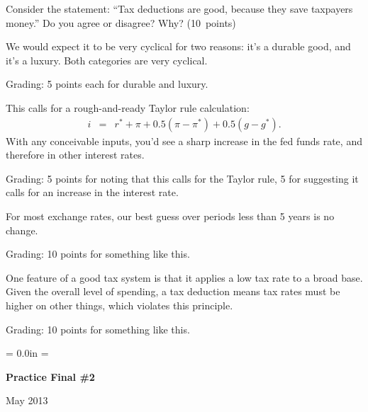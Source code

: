 \documentclass[letterpaper,12pt]{exam}
\def\HeadName{Practice Final \#1}
\begin{document}
\begin{questions}
\begin{parts}
\item Consider the statement:  ``Tax deductions are good, because they save taxpayers money.''
Do you agree or disagree?  Why?
(10~points)
\end{parts}

\begin{solution}
\begin{parts}
\item We would expect it to be very cyclical for two reasons:
it's a durable good, and it's a luxury.
Both categories are very cyclical.

Grading:  5 points each for durable and luxury.

\item This calls for a rough-and-ready Taylor rule calculation:
\begin{eqnarray*}
    i &=& r^* + \pi + 0.5 (\pi - \pi^*) + 0.5 (g - g^*) .
\end{eqnarray*}
With any conceivable inputs, you'd see a sharp increase in the fed funds rate,
and therefore in other interest rates.

Grading:  5 points for noting that this calls for the Taylor rule,
5 for suggesting it calls for an increase in the interest rate.

\item For most exchange rates, our best guess over periods less than 5 years is no change.

Grading:  10 points for something like this.

\item One feature of a good tax system is that it applies a low tax rate to a broad
base.
Given the overall level of spending, a tax deduction means tax rates must be higher
on other things, which violates this principle.

Grading:  10 points for something like this.
\end{parts}
\end{solution}

\end{questions}




\newpage
\def\HeadName{Practice Final \#2}
\parindent = 0.0in
\parskip = \bigskipamount
\thispagestyle{empty}%
\Head

\centerline{\large \bf \HeadName}%
\centerline{May 2013}
\end{document}
